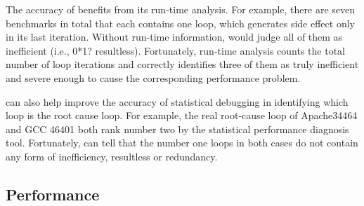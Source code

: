 The accuracy of \Tool benefits from its run-time analysis.
For example, there are seven benchmarks in total that each contains
one loop, which generates side effect only
in its last iteration. Without run-time information, \Tool would judge
all of them as inefficient (i.e., 0*1? resultless). Fortunately,
\Tool run-time analysis counts the total number of loop iterations and
correctly identifies three of them as truly inefficient and severe enough
to cause the corresponding performance problem.

\Tool can also help improve the accuracy of statistical debugging in
identifying which loop is the root cause loop.
For example, the real root-cause loop of Apache34464 and GCC 46401 both
rank number two by the statistical performance diagnosis tool.
Fortunately,
\Tool can tell that the number one loops in both cases do not contain
any form of inefficiency, resultless or redundancy. 

\subsection{Performance}
\label{sec:result_perf}

